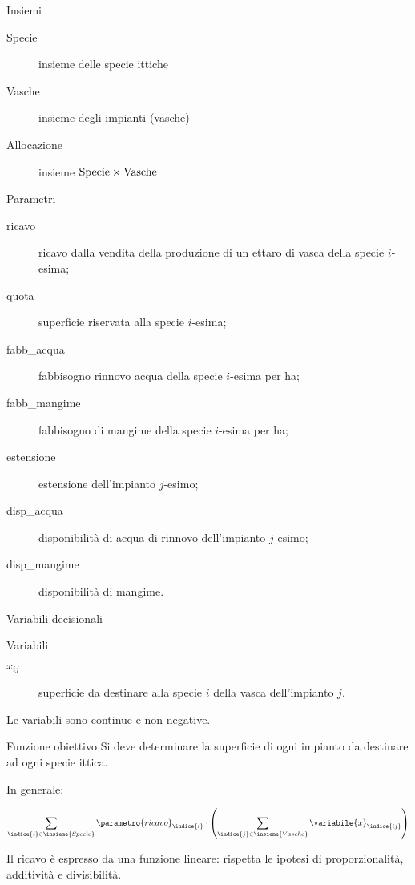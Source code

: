 \documentclass{beamer}
\begin{document}
\begin{frame}{Insiemi}
  \begin{description}
	  \item[Specie] insieme delle specie ittiche
	  \item[Vasche] insieme degli impianti (vasche)
	  \item[Allocazione] insieme $\rm Specie \times \rm Vasche$
  \end{description}
\end{frame}

 \begin{frame}{Parametri}
		\begin{description}
			\item[ricavo] ricavo dalla vendita della produzione di un ettaro di vasca della specie $i$-esima;
			\item[quota] superficie riservata alla specie $i$-esima;
			\item[fabb\_acqua] fabbisogno rinnovo acqua della specie $i$-esima per ha;
			\item[fabb\_mangime] fabbisogno di mangime della specie $i$-esima per ha;
			\item[estensione] estensione dell'impianto $j$-esimo;
			\item[disp\_acqua] disponibilit\`a di acqua di rinnovo dell'impianto $j$-esimo;
			\item[disp\_mangime] disponibilit\`a di mangime.
		\end{description}
\end{frame}

\begin{frame}{Variabili decisionali}
\begin{block}{Variabili}
	\begin{description}
		\item[$x_{ij}$] superficie da destinare alla specie $i$ della vasca dell'impianto $j$.
	\end{description}
\end{block}

  Le variabili sono continue e non negative.

\end{frame}

\begin{frame}{Funzione obiettivo}
Si deve determinare la superficie di ogni impianto da destinare ad ogni specie ittica.

In generale:

$$  \sum_{\indice{i} \in \insieme{Specie}} \parametro{ricavo}_{\indice{i}}\cdot
         \left(\sum_{\indice{j} \in \insieme{Vasche}} \variabile{x}_{\indice{ij}}\right)$$

Il ricavo \`e espresso da una funzione lineare: rispetta le ipotesi di proporzionalit\`a, additivit\`a e divisibilit\`a.
\end{frame}
\end{document}
